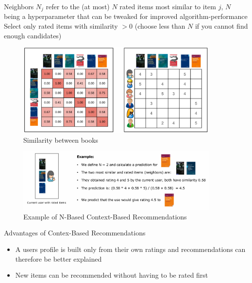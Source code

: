 \documentclass[11pt]{article}
\begin{document}
\vspace{10px}

Neighbors $N_j$ refer to the (at most) $N$ rated items most similar to item $j$, $N$ being a hyperparameter that can be tweaked for improved algorithm-performance
\noindent Select only rated items with similarity $> 0$ (choose less than $N$ if you cannot find enough candidates)

\vspace{50px}

\begin{figure}[htb!]
    \centering
    \includegraphics[keepaspectratio=true, width=0.9\textwidth]{context_based_recommendations_v3.png}
    \caption{Similarity between books}
    \label{fig:book_similarity}
\end{figure}

\begin{figure}[htb!]
    \centering
    \includegraphics[keepaspectratio=true, width=0.9\textwidth]{context_based_recommendations_v4.png}
    \caption{Example of N-Based Context-Based Recommendations}
    \label{fig:context_based_example}
\end{figure}

\restoregeometry

Advantages of Contex-Based Recommendations

\begin{itemize}
    \item A users profile is built only from their own ratings and recommendations can therefore be better explained
    \item New items can be recommended without having to be rated first
\end{itemize}
\end{document}
